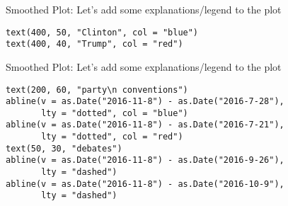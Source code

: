 \documentclass[presentation]{beamer}
\begin{document}
\begin{frame}[fragile,label={sec:orgfeaaf29}]{Smoothed Plot:}
 Let's add some explanations/legend to the plot

\begin{verbatim}
text(400, 50, "Clinton", col = "blue")
text(400, 40, "Trump", col = "red")
\end{verbatim}
\end{frame}


\begin{frame}[fragile,label={sec:org74aec80}]{Smoothed Plot:}
 Let's add some explanations/legend to the plot

\begin{verbatim}
text(200, 60, "party\n conventions")
abline(v = as.Date("2016-11-8") - as.Date("2016-7-28"),
       lty = "dotted", col = "blue")
abline(v = as.Date("2016-11-8") - as.Date("2016-7-21"),
       lty = "dotted", col = "red")
text(50, 30, "debates")
abline(v = as.Date("2016-11-8") - as.Date("2016-9-26"),
       lty = "dashed")
abline(v = as.Date("2016-11-8") - as.Date("2016-10-9"),
       lty = "dashed")
\end{verbatim}
\end{frame}
\end{document}
